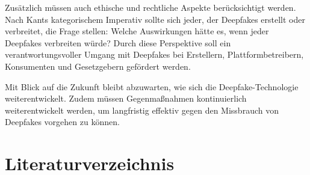 \documentclass[a4paper,12pt]{article}
\begin{document}
Zusätzlich müssen auch ethische und rechtliche Aspekte berücksichtigt werden. Nach Kants kategorischem Imperativ sollte sich jeder, der Deepfakes erstellt oder verbreitet, die Frage stellen: Welche Auswirkungen hätte es, wenn jeder Deepfakes verbreiten würde? Durch diese Perspektive soll ein verantwortungsvoller Umgang mit Deepfakes bei Erstellern, Plattformbetreibern, Konsumenten und Gesetzgebern gefördert werden.

Mit Blick auf die Zukunft bleibt abzuwarten, wie sich die Deepfake-Technologie weiterentwickelt. Zudem müssen Gegenmaßnahmen kontinuierlich weiterentwickelt werden, um langfristig effektiv gegen den Missbrauch von Deepfakes vorgehen zu können.
\newpage

\section*{Literaturverzeichnis}
\end{document}
